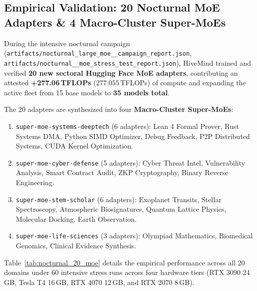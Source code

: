 \documentclass[11pt,a4paper]{article}
\begin{document}
\subsection{Empirical Validation: 20 Nocturnal MoE Adapters \& 4 Macro-Cluster Super-MoEs}
\label{sec:nocturnal_20_moe_results}

During the intensive nocturnal campaign (\texttt{artifacts/\allowbreak nocturnal\_\allowbreak large\_\allowbreak moe\_\_\allowbreak campaign\_\allowbreak report.json}, \texttt{artifacts/\allowbreak nocturnal\_\_\allowbreak moe\_\allowbreak stress\_\allowbreak test\_\allowbreak report.json}), HiveMind trained and verified \textbf{20 new sectoral Hugging Face MoE adapters}, contributing an attested \textbf{+277.06\,TFLOPs} ($277.055$\,TFLOPs) of compute and expanding the active fleet from 15 base models to \textbf{35 models total}.

The 20 adapters are synthesized into four \textbf{Macro-Cluster Super-MoEs}:
\begin{enumerate}[leftmargin=1.8em]
    \item \texttt{super-moe-systems-deeptech} (6 adapters): Lean 4 Formal Prover, Rust Systems DMA, Python SIMD Optimizer, Debug Feedback, P2P Distributed Systems, CUDA Kernel Optimization.
    \item \texttt{super-moe-cyber-defense} (5 adapters): Cyber Threat Intel, Vulnerability Analysis, Smart Contract Audit, ZKP Cryptography, Binary Reverse Engineering.
    \item \texttt{super-moe-stem-scholar} (6 adapters): Exoplanet Transits, Stellar Spectroscopy, Atmospheric Biosignatures, Quantum Lattice Physics, Molecular Docking, Earth Observation.
    \item \texttt{super-moe-life-sciences} (3 adapters): Olympiad Mathematics, Biomedical Genomics, Clinical Evidence Synthesis.
\end{enumerate}

Table~\ref{tab:nocturnal_20_moe} details the empirical performance across all 20 domains under 60 intensive stress runs across four hardware tiers (RTX 3090 24\,GB, Tesla T4 16\,GB, RTX 4070 12\,GB, and RTX 2070 8\,GB).
\end{document}
